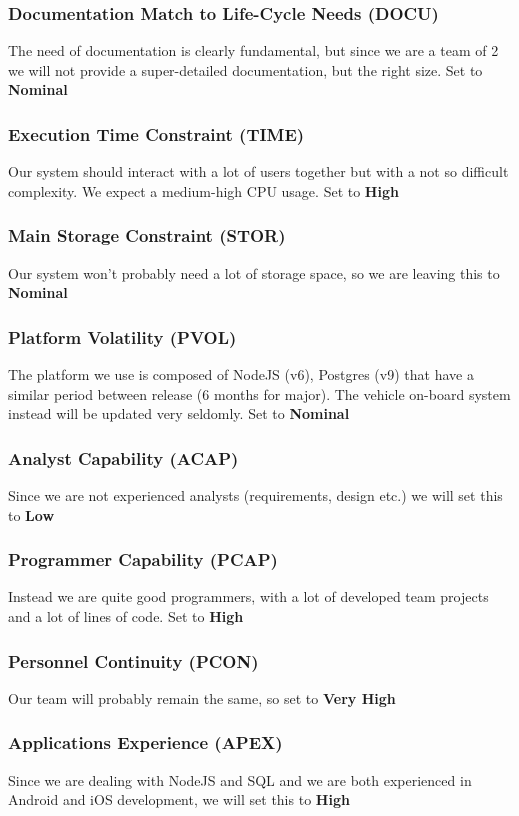 \subsubsection{Documentation Match to Life-Cycle Needs (DOCU)}
The need of documentation is clearly fundamental, but since we are a team of 2 we will not provide a super-detailed documentation, but the right size. Set to \textbf{Nominal}
\subsubsection{Execution Time Constraint (TIME)}
Our system should interact with a lot of users together but with a not so difficult complexity. We expect a medium-high CPU usage. Set to \textbf{High}
\subsubsection{Main Storage Constraint (STOR)}
Our system won't probably need a lot of storage space, so we are leaving this to \textbf{Nominal}
\subsubsection{Platform Volatility (PVOL)}
The platform we use is composed of NodeJS (v6), Postgres (v9) that have a similar period between release (6 months for major). The vehicle on-board system instead will be updated very seldomly. Set to \textbf{Nominal}
\subsubsection{Analyst Capability (ACAP)}
Since we are not experienced analysts (requirements, design etc.) we will set this to \textbf{Low}
\subsubsection{Programmer Capability (PCAP)}
Instead we are quite good programmers, with a lot of developed team projects and a lot of lines of code. Set to \textbf{High}
\subsubsection{Personnel Continuity (PCON)}
Our team will probably remain the same, so set to \textbf{Very High}
\subsubsection{Applications Experience (APEX)}
Since we are dealing with NodeJS and SQL and we are both experienced in Android and iOS development, we will set this to \textbf{High}
